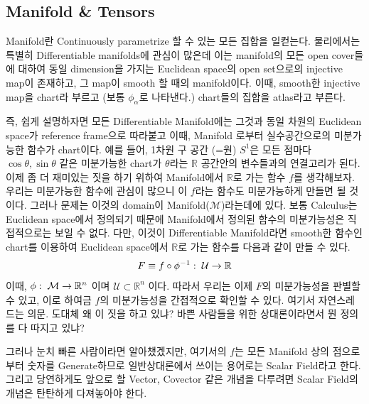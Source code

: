 \documentclass[final]{IEEEphot} %
\numberwithin{equation}{section} %
\numberwithin{figure}{section} %
\numberwithin{table}{section} %
\theoremstyle{plain}
\newcommand{\HS}{\hspace{0.5cm}}
\newcommand{\VS}{\vspace{0.3cm}}
\begin{document}
\subsection{Manifold \& Tensors}

\HS Manifold란 Continuously parametrize 할 수 있는 모든 집합을 일컫는다. 물리에서는 특별히 Differentiable manifolds에 관심이 많은데 이는 manifold의 모든
 open cover들에 대하여 동일 dimension을 가지는 Euclidean space의 open set으로의 injective map이 존재하고, 그 map이 smooth 할 때의 manifold이다.\footnotemark
{}
이때, smooth한 injective map을 chart라 부르고 (보통 $\phi_{\alpha}$로 나타낸다.) chart들의 집합을 atlas라고 부른다.

\VS

\HS 즉, 쉽게 설명하자면 모든 Differentiable Manifold에는 그것과 동일 차원의 Euclidean space가 reference frame으로 따라붙고 이때, Manifold 로부터 실수공간으로의 
미분가능한 함수가 chart이다. 예를 들어, 1차원 구 공간 (=원) $S^1$은 모든 점마다 $\cos \theta, \sin \theta$ 같은 미분가능한 chart가 $\theta$라는 $\mathbb{R}$ 공간안의 변수들과의 연결고리가 된다.
이제 좀 더 재미있는 짓을 하기 위하여 Manifold에서 $\mathbb{R}$로 가는 함수 $f$를 생각해보자. 우리는 미분가능한 함수에 관심이 많으니 이 $f$라는 함수도 미분가능하게 만들면 될 것이다.
그러나 문제는 이것의 domain이 Manifold($\mathcal{M}$)라는데에 있다. 보통 Calculus는 Euclidean space에서 정의되기 때문에 Manifold에서 정의된 함수의 미분가능성은 직접적으로는 보일 수 없다.
다만, 이것이 Differentiable Manifold라면 smooth한 함수인 chart를 이용하여 Euclidean space에서 $\mathbb{R}$로 가는 함수를 다음과 같이 만들 수 있다.
\begin{equation*}
 F \equiv f \circ \phi^{-1} :\hspace{0.1cm} \mathcal{U} \rightarrow \mathbb{R}
\end{equation*}
이때, $\phi:\hspace{0.1cm} \mathcal{M} \rightarrow \mathbb{R}^n$ 이며 $\mathcal{U} \subset \mathbb{R}^n$ 이다. 따라서 우리는 이제 $F$의 미분가능성을 판별할 수 있고, 
이로 하여금 $f$의 미분가능성을 간접적으로 확인할 수 있다. 여기서 자연스레 드는 의문. 도대체 왜 이 짓을 하고 있냐? 바쁜 사람들을 위한 상대론이라면서 뭔 정의를 다 따지고 있냐?

그러나 눈치 빠른 사람이라면 알아챘겠지만, 여기서의 $f$는 모든 Manifold 상의 점으로부터 숫자를 Generate하므로 일반상대론에서 쓰이는 용어로는 Scalar Field라고 한다.
그리고 당연하게도 앞으로 할 Vector, Covector 같은 개념을 다루려면 Scalar Field의 개념은 탄탄하게 다져놓아야 한다.\footnotemark
{}
 
\end{document}

